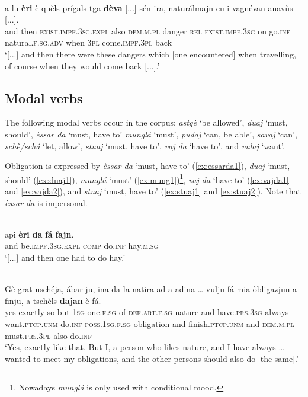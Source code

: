 \ea
\label{ex:exist:daessar2}
\\
\gll [...] a lu \textbf{èri} è quèls prígals tga \textbf{dèva} [...] sén ira, naturálmajn cu i vagnévan anavùs [...].\\
{} and then \textsc{exist.impf.3sg.expl} also \textsc{dem.m.pl} danger \textsc{rel} \textsc{exist.impf.3sg} {} on go.\textsc{inf} natural.\textsc{f.sg.adv} when \textsc{3pl} come.\textsc{impf.3pl} back\\
\glt `[...] and then there were these dangers which [one encountered] when travelling, of course when they would come back [...].'
\z



\subsection{Modal verbs}
The following modal verbs occur in the corpus: \textit{astgè} `be allowed', \textit{duaj} `must, should', \textit{èssar da} `must, have to' \textit{munglá} `must', \textit{pudaj} `can, be able', \textit{savaj} `can', \textit{schè/schá} `let, allow', \textit{stuaj} `must, have to', \textit{vaj da} `have to', and \textit{vulaj} `want'.

Obligation is expressed by \textit{èssar da} `must, have to' (\ref{ex:essarda1}), \textit{duaj} `must, should' (\ref{ex:duaj1}), \textit{munglá} `must' (\ref{ex:mung1})\footnote{Nowadays \textit{munglá} is only used with conditional mood.}, \textit{vaj da} `have to' (\ref{ex:vajda1} and \ref{ex:vajda2}), and \textit{stuaj} `must, have to' (\ref{ex:stuaj1} and \ref{ex:stuaj2}). Note that \textit{èssar da} is impersonal.

\ea
\label{ex:essarda1}
\\
	\gll [...] api \textbf{èri} \textbf{da} \textbf{fá} \textbf{fajn}.\\
{} and be.\textsc{impf.3sg.expl} \textsc{comp} do.\textsc{inf} hay.\textsc{m.sg}\\
\glt `[...] and then one had to do hay.'
\z

\ea
\label{ex:duaj1}
\\
\gll Gè grat uschéja, ábar ju, ina da la natira ad a adina … vulju fá mia òbligazjun a finju, a tschèls \textbf{dajan} è fá.\\
yes exactly so but \textsc{1sg} one.\textsc{f.sg} of \textsc{def.art.f.sg} nature and have.\textsc{prs.3sg} always {} want.\textsc{ptcp.unm} do.\textsc{inf} \textsc{poss.1sg.f.sg} obligation and finish.\textsc{ptcp.unm} and \textsc{dem.m.pl} must.\textsc{prs.3pl} also do.\textsc{inf}\\
\glt `Yes, exactly like that. But I, a person who likes nature, and I have always … wanted to meet my obligations, and the other persons should also do [the same].'
\z

